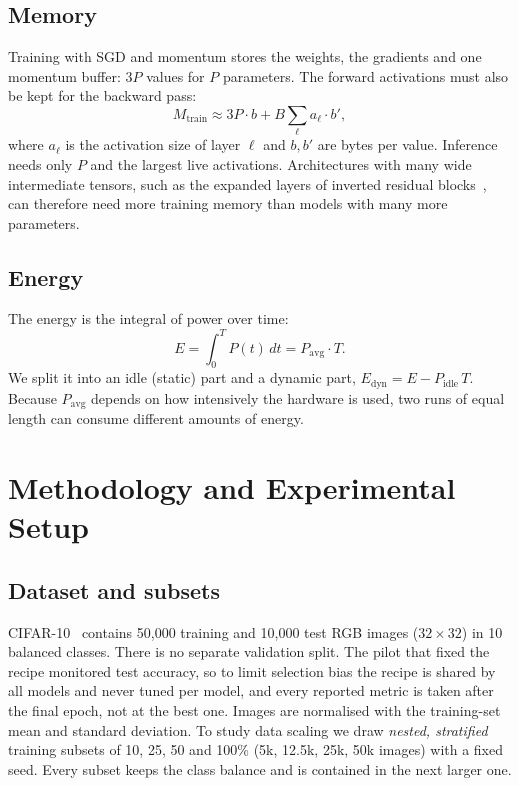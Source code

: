 \documentclass[conference]{IEEEtran}
\begin{document}
\subsection{Memory}
Training with SGD and momentum stores the weights, the gradients and one momentum buffer: $3P$ values for $P$ parameters. The forward activations must also be kept for the backward pass:
\begin{equation}
   M_{\mathrm{train}} \approx 3P\cdot b + B\sum_{\ell} a_\ell \cdot b',
\end{equation}
where $a_\ell$ is the activation size of layer $\ell$ and $b, b'$ are bytes per value. Inference needs only $P$ and the largest live activations. Architectures with many wide intermediate tensors, such as the expanded layers of inverted residual blocks~\cite{sandler2018mobilenetv2}, can therefore need more training memory than models with many more parameters.

\subsection{Energy}
The energy is the integral of power over time:
\begin{equation}
   E = \int_0^{T} P(t)\,dt = P_{\mathrm{avg}}\cdot T.
\end{equation}
We split it into an idle (static) part and a dynamic part, $E_{\mathrm{dyn}} = E - P_{\mathrm{idle}}\,T$. Because $P_{\mathrm{avg}}$ depends on how intensively the hardware is used, two runs of equal length can consume different amounts of energy.

\section{Methodology and Experimental Setup}
\subsection{Dataset and subsets}
CIFAR-10~\cite{krizhevsky2009cifar} contains 50{,}000 training and 10{,}000 test RGB images ($32\times32$) in 10 balanced classes. There is no separate validation split. The pilot that fixed the recipe monitored test accuracy, so to limit selection bias the recipe is shared by all models and never tuned per model, and every reported metric is taken after the final epoch, not at the best one. Images are normalised with the training-set mean and standard deviation. To study data scaling we draw \emph{nested, stratified} training subsets of 10, 25, 50 and 100\% (5k, 12.5k, 25k, 50k images) with a fixed seed. Every subset keeps the class balance and is contained in the next larger one.
\end{document}
